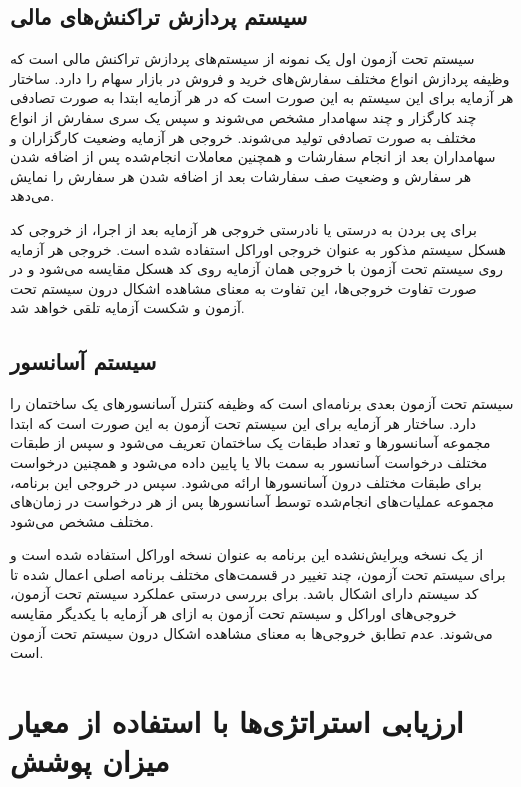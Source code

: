 \subsection{سیستم پردازش تراکنش‌های مالی}

سیستم تحت آزمون اول یک نمونه از سیستم‌های پردازش تراکنش مالی است که وظیفه پردازش انواع مختلف سفارش‌های خرید و فروش در بازار سهام را دارد. ساختار هر آزمایه برای این سیستم به این صورت است که در هر آزمایه ابتدا به صورت تصادفی چند کارگزار و چند سهامدار مشخص می‌شوند و سپس یک سری سفارش از انواع مختلف به صورت تصادفی تولید می‌شوند. خروجی هر آزمایه وضعیت کارگزاران و سهامداران بعد از انجام سفارشات و همچنین معاملات انجام‌شده پس از اضافه شدن هر سفارش و وضعیت صف سفارشات بعد از اضافه شدن هر سفارش را نمایش می‌دهد. 

برای پی بردن به درستی یا نادرستی خروجی هر آزمایه بعد از اجرا، از خروجی کد هسکل سیستم مذکور به عنوان خروجی اوراکل استفاده شده است. خروجی هر آزمایه روی سیستم تحت آزمون با خروجی همان آزمایه روی کد هسکل مقایسه می‌شود و در صورت تفاوت خروجی‌ها، این تفاوت به معنای مشاهده اشکال درون سیستم تحت آزمون و شکست آزمایه تلقی خواهد شد.

\subsection{سیستم آسانسور}

سیستم تحت آزمون بعدی برنامه‌ای است که وظیفه کنترل آسانسورهای یک ساختمان را دارد. ساختار هر آزمایه برای این سیستم تحت آزمون به این صورت است که ابتدا مجموعه آسانسورها و تعداد طبقات یک ساختمان تعریف می‌شود و سپس از طبقات مختلف درخواست آسانسور به سمت‌ بالا یا پایین داده می‌شود و همچنین درخواست برای طبقات مختلف درون آسانسورها ارائه می‌شود. سپس در خروجی این برنامه، مجموعه عملیات‌های انجام‌شده توسط آسانسورها پس از هر درخواست در زمان‌های مختلف مشخص می‌شود.

از یک نسخه ویرایش‌نشده این برنامه به عنوان نسخه اوراکل استفاده شده است و برای سیستم تحت آزمون، چند تغییر در قسمت‌های مختلف برنامه اصلی اعمال شده تا کد سیستم دارای اشکال باشد. برای بررسی درستی عملکرد سیستم تحت آزمون، خروجی‌های اوراکل و سیستم تحت آزمون به ازای هر آزمایه با یکدیگر مقایسه می‌شوند. عدم تطابق خروجی‌ها به معنای مشاهده اشکال درون سیستم تحت آزمون است.

\section{ارزیابی استراتژی‌ها با استفاده از معیار میزان پوشش}

